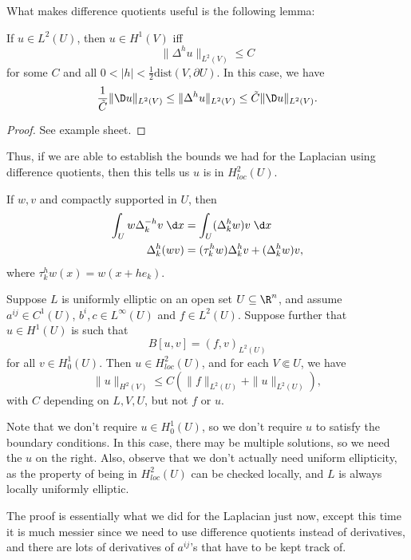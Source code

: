 \documentclass[a4paper]{article}
\begin{document}
What makes difference quotients useful is the following lemma:

\begin{lemma}
  If $u \in L^2(U)$, then $u \in H^1(V)$ iff
  \[
    \|\Delta^h u\|_{L^2(V)} \leq C
  \]
  for some $C$ and all $0 < |h| < \frac{1}{2} \mathrm{dist}(V, \partial U)$. In this case, we have
  \[
    \frac{1}{\tilde{C}} \|\D u\|_{L^2(V)} \leq \|\Delta^h u\|_{L^2(V)} \leq \tilde{C} \|\D u\|_{L^2(V)}.
  \]
\end{lemma}

\begin{proof}
  See example sheet.
\end{proof}

Thus, if we are able to establish the bounds we had for the Laplacian using difference quotients, then this tells us $u$ is in $H^2_{loc}(U)$.

\begin{lemma}
  If $w, v$ and compactly supported in $U$, then
  \begin{align*}
    \int_U w \Delta_k^{-h}v\;\d x &= \int_U (\Delta^h_k w) v\;\d x\\
    \Delta^h_k(w v) &= (\tau_k^h w) \Delta_k^h v + (\Delta_k^h w) v,
  \end{align*}
  where $\tau_k^h w (x) = w(x + h e_k)$.
\end{lemma}

\begin{thm}
  Suppose $L$ is uniformly elliptic on an open set $U \subseteq \R^n$, and assume $a^{ij} \in C^1(U)$, $b^i, c \in L^\infty(U)$ and $f \in L^2(U)$. Suppose further that $u \in H^1(U)$ is such that
  \[
    B[u, v] = (f, v)_{L^2(U)}\tag{$\dagger$}
  \]
  for all $v \in H_0^1(U)$. Then $u \in H_{loc}^2(U)$, and for each $V \Subset U$, we have
  \[
    \|u\|_{H^2(V)} \leq C (\|f\|_{L^2(U)} + \|u\|_{L^2(U)}),
  \]
  with $C$ depending on $L, V, U$, but not $f$ or $u$.
\end{thm}
Note that we don't require $u \in H^1_0(U)$, so we don't require $u$ to satisfy the boundary conditions. In this case, there may be multiple solutions, so we need the $u$ on the right. Also, observe that we don't actually need uniform ellipticity, as the property of being in $H^2_{loc}(U)$ can be checked locally, and $L$ is always locally uniformly elliptic.

The proof is essentially what we did for the Laplacian just now, except this time it is much messier since we need to use difference quotients instead of derivatives, and there are lots of derivatives of $a^{ij}$'s that have to be kept track of.
\end{document}
